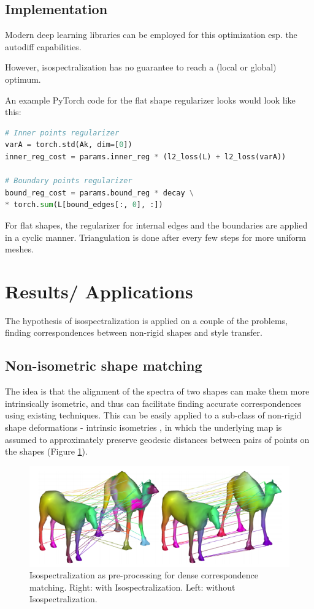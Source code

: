 \documentclass[a4paper,10pt]{article}
\begin{document}
\subsection{Implementation}

Modern deep learning libraries can be employed for this optimization esp. the autodiff capabilities.

However, isospectralization has no
guarantee to reach a (local or global) optimum.

An example PyTorch code for the flat shape regularizer looks would look like this: 

\begin{lstlisting}[language=Python]
 # Inner points regularizer
varA = torch.std(Ak, dim=[0])
inner_reg_cost = params.inner_reg * (l2_loss(L) + l2_loss(varA))

# Boundary points regularizer
bound_reg_cost = params.bound_reg * decay \
* torch.sum(L[bound_edges[:, 0], :])
\end{lstlisting}

For flat shapes, the regularizer for internal edges and the boundaries are applied in a cyclic manner. Triangulation is done after every few steps for more uniform meshes.

\section{Results/ Applications}

The hypothesis of isospectralization is applied on a couple of 
the problems, finding correspondences between non-rigid
shapes and style transfer.

\subsection{Non-isometric shape matching}

The idea is that the alignment of the
spectra of two shapes can make them more intrinsically isometric, and thus can facilitate finding accurate correspondences using existing techniques. This can be easily applied to a sub-class of non-rigid
shape deformations - intrinsic isometries \cite{kim2011blended}, in which the underlying map is assumed to approximately preserve geodesic distances between pairs of points on the shapes (Figure \ref{fig:Correspondenses}). 

\begin{figure}[hbt!]
 \includegraphics[width=\textwidth]{Correspondenses.png}
 \caption{\label{fig:Correspondenses} Isospectralization as pre-processing for dense correspondence matching. Right: with Isospectralization. Left: without Isospectralization.}
\end{figure}
\end{document}
